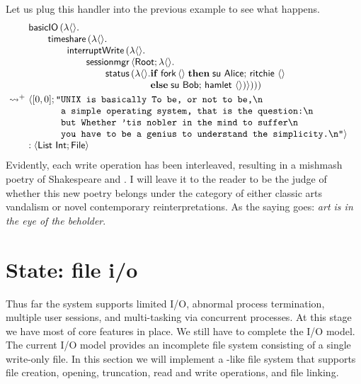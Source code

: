 \documentclass[12pt,phd,lfcs,twoside,openright,logo,leftchapter,normalheadings]{infthesis}
\theoremstyle{plain}
\theoremstyle{definition}
\begin{document}
Let us plug this handler into the previous example to see what
happens.
%
\[
  \ba{@{~}l@{~}l}
    &\bl
    \basicIO\,(\lambda\Unit.\\
         \qquad\timeshare\,(\lambda\Unit.\\
         \qquad\qquad\dec{interruptWrite}\,(\lambda\Unit.\\
         \qquad\qquad\qquad\sessionmgr\,\Record{\Root;\lambda\Unit.\\
         \qquad\qquad\qquad\qquad\status\,(\lambda\Unit.
                 \ba[t]{@{}l}
                   \If\;\fork\,\Unit\;\Then\;
                       \su~\Alice;\,
                       \quoteRitchie~\Unit\\
                   \Else\;
                       \su~\Bob;\,
                       \quoteHamlet~\Unit)})))
                 \ea
     \el \smallskip\\
     \reducesto^+&
     \bl
      \Record{
       \ba[t]{@{}l}
         [0, 0];
         \texttt{"}\ba[t]{@{}l}
         \texttt{UNIX is basically To be, or not to be,\nl{}}\\
         \texttt{a simple operating system, that is the question:\nl{}}\\
         \texttt{but Whether 'tis nobler in the mind to suffer\nl{}}\\
         \texttt{you have to be a genius to understand the simplicity.\nl{}"}}
         \ea
       \ea\\
       : \Record{\List~\Int; \UFile}
     \el
  \ea
\]
%
Evidently, each write operation has been interleaved, resulting in a
mishmash poetry of Shakespeare and \UNIX{}.
%
I will leave it to the reader to be the judge of whether this new
poetry belongs under the category of either classic arts vandalism or
novel contemporary reinterpretations.  As the saying goes: \emph{art
  is in the eye of the beholder}.

\section{State: file i/o}
\label{sec:tiny-unix-io}

Thus far the system supports limited I/O, abnormal process
termination, multiple user sessions, and multi-tasking via concurrent
processes. At this stage we have most of core features in place. We
still have to complete the I/O model. The current I/O model provides
an incomplete file system consisting of a single write-only file.
%
In this section we will implement a \UNIX{}-like file system that
supports file creation, opening, truncation, read and write
operations, and file linking.
%
\end{document}
